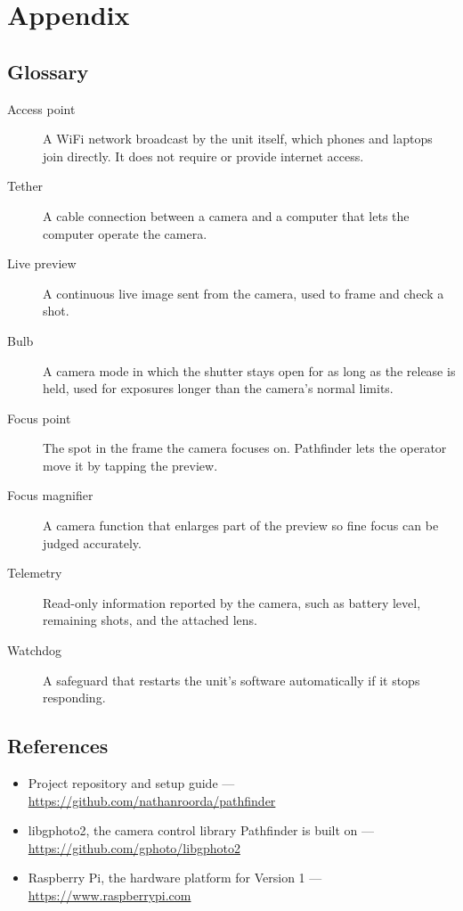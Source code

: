 \documentclass[11pt,a4paper]{article}
\begin{document}
\appendix
\section{Appendix}
\subsection{Glossary}
\begin{description}
    \item[Access point] A WiFi network broadcast by the unit itself, which phones and laptops join directly. It does not require or provide internet access.
    \item[Tether] A cable connection between a camera and a computer that lets the computer operate the camera.
    \item[Live preview] A continuous live image sent from the camera, used to frame and check a shot.
    \item[Bulb] A camera mode in which the shutter stays open for as long as the release is held, used for exposures longer than the camera's normal limits.
    \item[Focus point] The spot in the frame the camera focuses on. Pathfinder lets the operator move it by tapping the preview.
    \item[Focus magnifier] A camera function that enlarges part of the preview so fine focus can be judged accurately.
    \item[Telemetry] Read-only information reported by the camera, such as battery level, remaining shots, and the attached lens.
    \item[Watchdog] A safeguard that restarts the unit's software automatically if it stops responding.
\end{description}

\subsection{References}
\begin{itemize}[leftmargin=1.5em]
    \item Project repository and setup guide --- \url{https://github.com/nathanroorda/pathfinder}
    \item libgphoto2, the camera control library Pathfinder is built on --- \url{https://github.com/gphoto/libgphoto2}
    \item Raspberry Pi, the hardware platform for Version 1 --- \url{https://www.raspberrypi.com}
\end{itemize}
\end{document}
